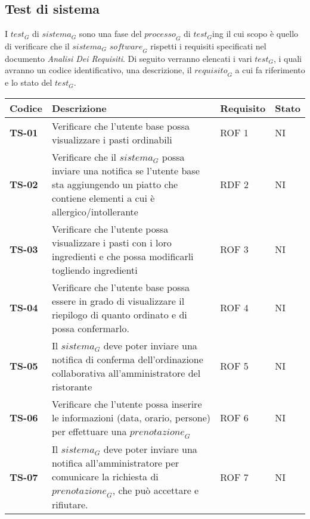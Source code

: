 \subsection{Test di sistema}
I $\textit{test}_G$ di $\textit{sistema}_G$ sono una fase del $\textit{processo}_G$ di $\textit{test}_G$ing il cui scopo è quello di verificare che il $\textit{sistema}_G$ $\textit{software}_G$ rispetti i requisiti specificati nel documento \textit{Analisi Dei Requisiti}.
Di seguito verranno elencati i vari $\textit{test}_G$, i quali avranno un codice identificativo, una descrizione, il $\textit{requisito}_G$ a cui fa riferimento e lo stato del $\textit{test}_G$.
    \begin{longtable}{|>{\centering\arraybackslash}p{1.5cm}|p{12cm}|p{2cm}|p{1cm}|}
  \hline
  \rowcolor{gray!30}
  \textbf{Codice} & \textbf{Descrizione} & \textbf{Requisito} & \textbf{Stato} \\
  \hline
  \rowcolor{gray!10}
  \textbf{TS-01} & Verificare che l'utente base possa visualizzare i pasti ordinabili & ROF 1 & NI \\
  \hline
  \rowcolor{gray!10}
  \textbf{TS-02} & Verificare che il $\textit{sistema}_G$ possa inviare una notifica se l'utente base sta aggiungendo un piatto che contiene elementi a cui è allergico/intollerante & RDF 2 & NI \\ 
  \hline 
  \rowcolor{gray!10}
  \textbf{TS-03} & Verificare che l'utente possa visualizzare i pasti con i loro ingredienti e che possa modificarli togliendo ingredienti & ROF 3 & NI \\ 
  \hline
  \rowcolor{gray!10}
  \textbf{TS-04} & Verificare che l’utente base possa essere in grado di visualizzare il riepilogo di
quanto ordinato e di possa confermarlo.& ROF 4 & NI \\ 
  \hline
  \rowcolor{gray!10}
  \textbf{TS-05} & Il $\textit{sistema}_G$ deve poter inviare una notifica di conferma dell’ordinazione collaborativa all’amministratore del ristorante & ROF 5 & NI \\ 
  \hline
  \rowcolor{gray!10}
  \textbf{TS-06} & Verificare che l'utente possa inserire le informazioni (data, orario, persone) per effettuare una $\textit{prenotazione}_G$ & ROF 6 & NI \\
  \hline
  \rowcolor{gray!10}
  \textbf{TS-07} & Il $\textit{sistema}_G$ deve poter inviare una notifica all’amministratore per comunicare la richiesta di $\textit{prenotazione}_G$, che può accettare e rifiutare. & ROF 7 & NI \\

\end{longtable}

